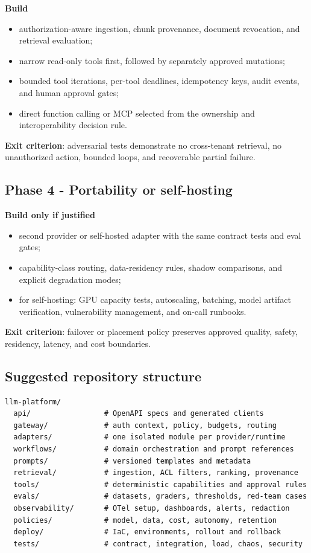 \documentclass[10pt]{article}
\begin{document}
\textbf{Build}
\begin{itemize}
  \item authorization-aware ingestion, chunk provenance, document revocation, and retrieval evaluation;
  \item narrow read-only tools first, followed by separately approved mutations;
  \item bounded tool iterations, per-tool deadlines, idempotency keys, audit events, and human approval gates;
  \item direct function calling or MCP selected from the ownership and interoperability decision rule.
\end{itemize}

\textbf{Exit criterion}: adversarial tests demonstrate no cross-tenant retrieval, no unauthorized action, bounded loops, and recoverable partial failure.

\subsection{Phase 4 - Portability or self-hosting}

\textbf{Build only if justified}
\begin{itemize}
  \item second provider or self-hosted adapter with the same contract tests and eval gates;
  \item capability-class routing, data-residency rules, shadow comparisons, and explicit degradation modes;
  \item for self-hosting: GPU capacity tests, autoscaling, batching, model artifact verification, vulnerability management, and on-call runbooks.
\end{itemize}

\textbf{Exit criterion}: failover or placement policy preserves approved quality, safety, residency, latency, and cost boundaries.

\subsection{Suggested repository structure}

\begin{lstlisting}[style=py,language={}]
llm-platform/
  api/                 # OpenAPI specs and generated clients
  gateway/             # auth context, policy, budgets, routing
  adapters/            # one isolated module per provider/runtime
  workflows/           # domain orchestration and prompt references
  prompts/             # versioned templates and metadata
  retrieval/           # ingestion, ACL filters, ranking, provenance
  tools/               # deterministic capabilities and approval rules
  evals/               # datasets, graders, thresholds, red-team cases
  observability/       # OTel setup, dashboards, alerts, redaction
  policies/            # model, data, cost, autonomy, retention
  deploy/              # IaC, environments, rollout and rollback
  tests/               # contract, integration, load, chaos, security
\end{lstlisting}
\end{document}
